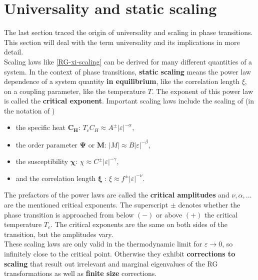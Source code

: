 	\section{Universality and static scaling} \label{Section::Universality}
	The last section traced the origin of universality and scaling in phase transitions. This section will deal with the term universality and its implications in more detail. \\
	
	Scaling laws like \autoref{RG-xi-scaling} can be derived for many different quantities of a system. In the context of phase transitions, \textbf{static scaling} means the power law dependence of a system quantity \textbf{in equilibrium}, like the correlation length $\xi$, on a coupling parameter, like the temperature $T$. The exponent of this power law is called the \textbf{critical exponent}. Important scaling laws include the scaling of (in the notation of \cite{pelissetto2002critical})
	\begin{itemize}
		\item the specific heat $\boldsymbol{C_H}$: $T_c C_H \approx A^{\pm} |\varepsilon|^{-\alpha}$,
		\item the order parameter $\boldsymbol{\Psi}$ or $\boldsymbol{M}$: $|M| \approx B |\varepsilon|^{-\beta}$,
		\item the susceptibility $\boldsymbol{\chi}$: $\chi \approx C^{\pm} |\varepsilon|^{-\gamma}$,
		\item and the correlation length $\boldsymbol{\xi}$ : $\xi \approx f^{\pm} |\varepsilon|^{-\nu}$.		
	\end{itemize}
	The prefactors of the power laws are called the \textbf{critical amplitudes} and $\nu, \alpha, ...$ are the mentioned critical exponents. The superscript $\pm$ denotes whether the phase transition is approached from below $(-)$ or above $(+)$ the critical temperature $T_c$. The critical exponents are the same on both sides of the transition, but the amplitudes vary. \\
	
	These scaling laws are only valid in the thermodynamic limit for $\varepsilon \rightarrow 0$, so infinitely close to the critical point. Otherwise they exhibit \textbf{corrections to scaling} that result out irrelevant and marginal eigenvalues of the RG transformations as well as \textbf{finite size} corrections. \\
	
